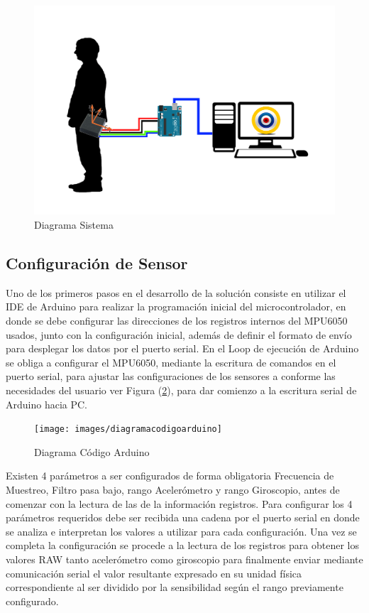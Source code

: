\documentclass[12pt,a4paper]{article}
\begin{document}
\begin{figure}[H]
\centering
\includegraphics[scale=0.2]{images/diagrama_sistema}
\caption{Diagrama Sistema}
\label{fig:diagramasistema}
\end{figure}

\subsection{Configuración de Sensor}
Uno de los primeros pasos en el desarrollo de la solución consiste en utilizar el IDE de Arduino para realizar la programación inicial del microcontrolador, en donde se debe configurar las direcciones de los registros internos del MPU6050 usados, junto con la configuración inicial, además de definir el formato de envío para desplegar los datos por el puerto serial.
  En el Loop de ejecución de Arduino se obliga a configurar el MPU6050, mediante la escritura de comandos en el puerto serial, para ajustar las configuraciones de los sensores a conforme las necesidades del usuario ver Figura (\ref{fig:arduinocode}), para dar comienzo a la escritura serial de Arduino hacia PC.

\begin{figure}[H]
\centering
	\texttt{[image: images/diagramacodigoarduino]}
	\caption{Diagrama Código Arduino}
	\label{fig:arduinocode}
\end{figure}
  
  Existen 4 parámetros a ser configurados de forma obligatoria Frecuencia de Muestreo, Filtro pasa bajo, rango Acelerómetro y  rango Giroscopio, antes de comenzar con la lectura de las de la información registros.
Para configurar los 4 parámetros requeridos debe ser recibida una cadena por el puerto serial en donde se analiza e interpretan los valores a utilizar para cada configuración. 
Una vez se completa la configuración se procede a la lectura de los registros para obtener los valores RAW tanto acelerómetro como giroscopio para finalmente enviar mediante comunicación serial el valor resultante expresado en su unidad física correspondiente al ser dividido por la sensibilidad según el rango previamente configurado.
\end{document}
